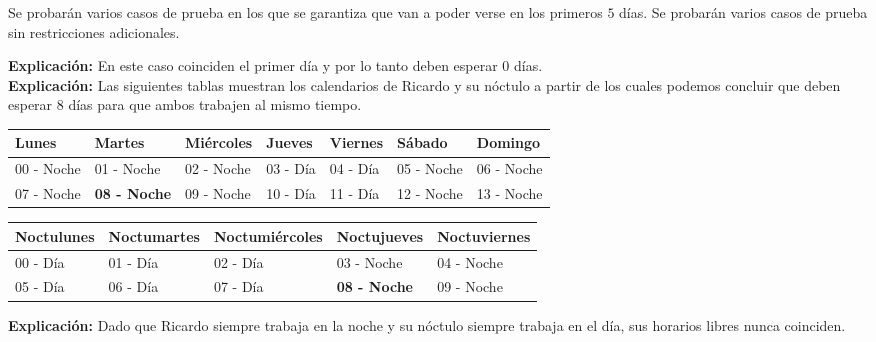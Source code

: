 \documentclass{oci}
\begin{document}
\begin{scoreDescription}
   Se probarán varios casos de prueba en los que se garantiza que van a poder verse en los primeros $5$ días.
   Se probarán varios casos de prueba sin restricciones adicionales.
\end{scoreDescription}

\begin{sampleDescription}
\vspace{-1em}
\textbf{Explicación:} En este caso coinciden el primer día y por lo tanto deben esperar 0 días.
\\

\vspace{-1em}
\textbf{Explicación:} Las siguientes tablas muestran los calendarios
de Ricardo y su nóctulo a partir de los cuales podemos concluir que deben esperar 8 días
para que ambos trabajen al mismo tiempo.
\begin{table}[h]
\hspace{1em}
\begin{tabular}{|l|l|l|l|l|l|l|}
\hline
Lunes      & Martes                             & Miércoles                          & Jueves   & Viernes  & Sábado     & Domingo    \\ \hline
00 - Noche & 01 - Noche                         & 02 - Noche                         & 03 - Día & 04 - Día & 05 - Noche & 06 - Noche \\ \hline
07 - Noche & \textbf{08 - Noche} & 09 - Noche & 10 - Día & 11 - Día & 12 - Noche & 13 - Noche \\ \hline
\end{tabular}
\end{table}

\begin{table}[h]
\hspace{1em}
\begin{tabular}{|l|l|l|l|l|}
\hline
Noctulunes & Noctumartes & Noctumiércoles & Noctujueves         & Noctuviernes \\ \hline
00 - Día   & 01 - Día    & 02 - Día       & 03 - Noche          & 04 - Noche   \\ \hline
05 - Día   & 06 - Día    & 07 - Día       & \textbf{08 - Noche} & 09 - Noche   \\ \hline
\end{tabular}
\end{table}

\vspace{1em}
\vspace{-1em}
\textbf{Explicación:} Dado que Ricardo siempre trabaja en la noche y su nóctulo siempre
trabaja en el día, sus horarios libres nunca coinciden.
\end{sampleDescription}
\end{document}
